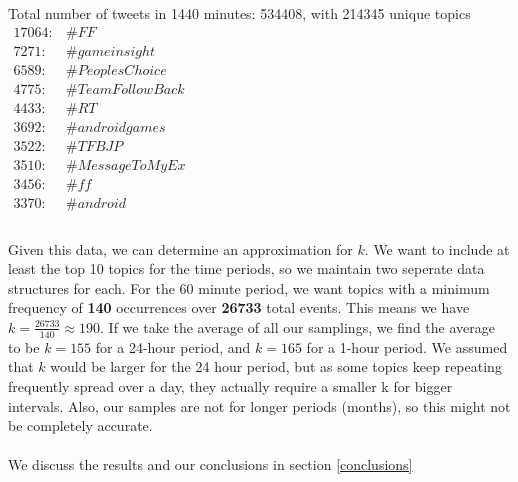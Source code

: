 Total number of tweets in 1440 minutes: 534408, with 214345 unique topics\\

$\begin{array}{ll}
    17064: & \#FF \\
    7271: & \#gameinsight \\
    6589: & \#PeoplesChoice \\
    4775: & \#TeamFollowBack \\
    4433: & \#RT \\
    3692: & \#androidgames \\
    3522: & \#TFBJP \\
    3510: & \#MessageToMyEx \\
    3456: & \#ff \\
    3370: & \#android \\
\end{array}$
\\
\\
Given this data, we can determine an approximation for $k$. We want to include at least the top 10 topics for the time periods, so we maintain two seperate data structures for each. For the 60 minute period, we want topics with a minimum frequency of \textbf{140} occurrences over \textbf{26733} total events. This means we have $k = \frac{26733}{140} \approx 190$. If we take the average of all our samplings, we find the average to be $k = 155$ for a 24-hour period, and $k = 165$ for a 1-hour period. We assumed that $k$ would be larger for the 24 hour period, but as some topics keep repeating frequently spread over a day, they actually require a smaller k for bigger intervals. Also, our samples are not for longer periods (months), so this might not be completely accurate.
\\
\\
We discuss the results and our conclusions in section \ref{conclusions}
